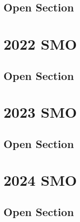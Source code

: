 \documentclass[a4paper, listof=totoc,bibliography=totoc,]{scrbook}
\begin{document}
\section{Open Section}


\chapter{2022 SMO}
\section{Open Section}



\chapter{2023 SMO}
\section{Open Section}



\chapter{2024 SMO}
\section{Open Section}


\end{document}

